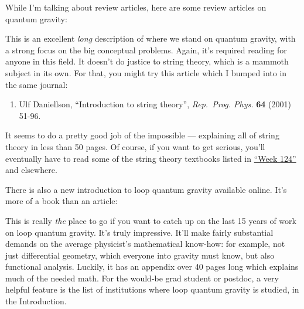 \documentclass{article}
\def\tightlist{}
\renewcommand{\texttt}[1]{%
  \begingroup
  \ttfamily
  \begingroup\lccode`~=`/\lowercase{\endgroup\def~}{/\discretionary{}{}{}}%
  \begingroup\lccode`~=`[\lowercase{\endgroup\def~}{[\discretionary{}{}{}}%
  \begingroup\lccode`~=`.\lowercase{\endgroup\def~}{.\discretionary{}{}{}}%
  \catcode`/=\active\catcode`[=\active\catcode`.=\active
  \scantokens{#1\noexpand}%
  \endgroup
}
\begin{document}
While I'm talking about review articles, here are some review articles
on quantum gravity:


This is an excellent \emph{long} description of where we stand on
quantum gravity, with a strong focus on the big conceptual problems.
Again, it's required reading for anyone in this field. It doesn't do
justice to string theory, which is a mammoth subject in its own. For
that, you might try this article which I bumped into in the same
journal:

\begin{enumerate}
\def\labelenumi{\arabic{enumi})}
\setcounter{enumi}{2}
\tightlist
\item
  Ulf Daniellson, ``Introduction to string theory'', \emph{Rep.~Prog.
  Phys.} \textbf{64} (2001) 51-96.
\end{enumerate}

It seems to do a pretty good job of the impossible --- explaining all of
string theory in less than 50 pages. Of course, if you want to get
serious, you'll eventually have to read some of the string theory
textbooks listed in \protect\hyperlink{week124}{``Week 124''} and
elsewhere.

There is also a new introduction to loop quantum gravity available
online. It's more of a book than an article:


This is really \emph{the} place to go if you want to catch up on the
last 15 years of work on loop quantum gravity. It's truly impressive.
It'll make fairly substantial demands on the average physicist's
mathematical know-how: for example, not just differential geometry,
which everyone into gravity must know, but also functional analysis.
Luckily, it has an appendix over 40 pages long which explains much of
the needed math. For the would-be grad student or postdoc, a very
helpful feature is the list of institutions where loop quantum gravity
is studied, in the Introduction.
\end{document}
